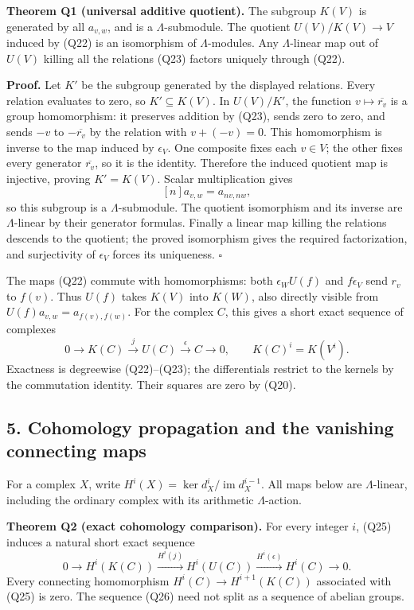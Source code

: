 \documentclass[
]{article}
\begin{document}
\textbf{Theorem Q1 (universal additive quotient).} The subgroup \(K(V)\)
is generated by all \(a_{v,w}\), and is a \(\Lambda\)-submodule. The
quotient \(U(V)/K(V)\to V\) induced by (Q22) is an isomorphism of
\(\Lambda\)-modules. Any \(\Lambda\)-linear map out of \(U(V)\) killing
all the relations (Q23) factors uniquely through (Q22).

\textbf{Proof.} Let \(K'\) be the subgroup generated by the displayed
relations. Every relation evaluates to zero, so \(K'\subseteq K(V)\). In
\(U(V)/K'\), the function \(v\mapsto\overline{r_v}\) is a group
homomorphism: it preserves addition by (Q23), sends zero to zero, and
sends \(-v\) to \(-\overline{r_v}\) by the relation with \(v+(-v)=0\).
This homomorphism is inverse to the map induced by \(\epsilon_V\). One
composite fixes each \(v\in V\); the other fixes every generator
\(\overline{r_v}\), so it is the identity. Therefore the induced
quotient map is injective, proving \(K'=K(V)\). Scalar multiplication
gives \[
[n]a_{v,w}=a_{nv,nw},
\tag{Q24}
\] so this subgroup is a \(\Lambda\)-submodule. The quotient isomorphism
and its inverse are \(\Lambda\)-linear by their generator formulas.
Finally a linear map killing the relations descends to the quotient; the
proved isomorphism gives the required factorization, and surjectivity of
\(\epsilon_V\) forces its uniqueness. \(\square\)

The maps (Q22) commute with homomorphisms: both \(\epsilon_W U(f)\) and
\(f\epsilon_V\) send \(r_v\) to \(f(v)\). Thus \(U(f)\) takes \(K(V)\)
into \(K(W)\), also directly visible from \(U(f)a_{v,w}=a_{f(v),f(w)}\).
For the complex \(C\), this gives a short exact sequence of complexes \[
0\longrightarrow K(C)\xrightarrow{j}U(C)
\xrightarrow{\epsilon}C\longrightarrow0,
\qquad K(C)^i=K(V^i).
\tag{Q25}
\] Exactness is degreewise (Q22)--(Q23); the differentials restrict to
the kernels by the commutation identity. Their squares are zero by
(Q20).

\subsection{5. Cohomology propagation and the vanishing connecting
maps}\label{cohomology-propagation-and-the-vanishing-connecting-maps}

For a complex \(X\), write
\(H^i(X)=\ker d_X^i/\operatorname{im}d_X^{i-1}\). All maps below are
\(\Lambda\)-linear, including the ordinary complex with its arithmetic
\(\Lambda\)-action.

\textbf{Theorem Q2 (exact cohomology comparison).} For every integer
\(i\), (Q25) induces a natural short exact sequence \[
0\longrightarrow H^i(K(C))\xrightarrow{H^i(j)}H^i(U(C))
\xrightarrow{H^i(\epsilon)}H^i(C)\longrightarrow0.
\tag{Q26}
\] Every connecting homomorphism \(H^i(C)\to H^{i+1}(K(C))\) associated
with (Q25) is zero. The sequence (Q26) need not split as a sequence of
abelian groups.
\end{document}
